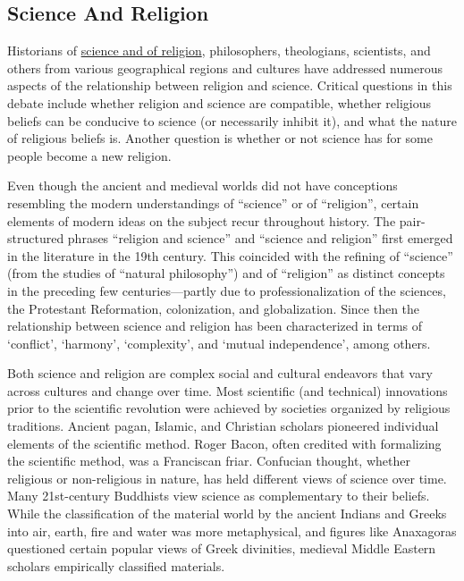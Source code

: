 \documentclass[
]{article}
\begin{document}
\hypertarget{science-and-religion}{%
\subsection{Science And Religion}\label{science-and-religion}}

Historians of
\href{https://en.wikipedia.org/wiki/Relationship_between_religion_and_science}{science
and of religion}, philosophers, theologians, scientists, and others from
various geographical regions and cultures have addressed numerous
aspects of the relationship between religion and science. Critical
questions in this debate include whether religion and science are
compatible, whether religious beliefs can be conducive to science (or
necessarily inhibit it), and what the nature of religious beliefs is.
Another question is whether or not science has for some people become a
new religion.

Even though the ancient and medieval worlds did not have conceptions
resembling the modern understandings of ``science'' or of ``religion'',
certain elements of modern ideas on the subject recur throughout
history. The pair-structured phrases ``religion and science'' and
``science and religion'' first emerged in the literature in the 19th
century. This coincided with the refining of ``science'' (from the
studies of ``natural philosophy'') and of ``religion'' as distinct
concepts in the preceding few centuries---partly due to
professionalization of the sciences, the Protestant Reformation,
colonization, and globalization. Since then the relationship between
science and religion has been characterized in terms of `conflict',
`harmony', `complexity', and `mutual independence', among others.

Both science and religion are complex social and cultural endeavors that
vary across cultures and change over time. Most scientific (and
technical) innovations prior to the scientific revolution were achieved
by societies organized by religious traditions. Ancient pagan, Islamic,
and Christian scholars pioneered individual elements of the scientific
method. Roger Bacon, often credited with formalizing the scientific
method, was a Franciscan friar. Confucian thought, whether religious or
non-religious in nature, has held different views of science over time.
Many 21st-century Buddhists view science as complementary to their
beliefs. While the classification of the material world by the ancient
Indians and Greeks into air, earth, fire and water was more
metaphysical, and figures like Anaxagoras questioned certain popular
views of Greek divinities, medieval Middle Eastern scholars empirically
classified materials.
\end{document}
